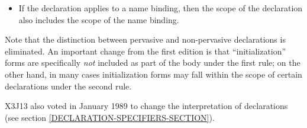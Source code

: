 \begin{defspec}
\begin{new}
\begin{itemize}
\item If the declaration applies to a name binding, then the scope of the
declaration also includes the scope of the name binding.
\end{itemize}
Note that
the distinction between pervasive and non-pervasive
declarations is eliminated.  An important change
from the first edition is that ``initialization''
forms are specifically \emph{not} included as part of the body under the first
rule; on the other hand, in many cases initialization forms may fall
within the scope of certain declarations under the second rule.
\end{new}

\begin{new}
X3J13 also voted in January 1989
to change the interpretation
of  declarations (see section \ref{DECLARATION-SPECIFIERS-SECTION}).
\end{new}


\end{defspec}
